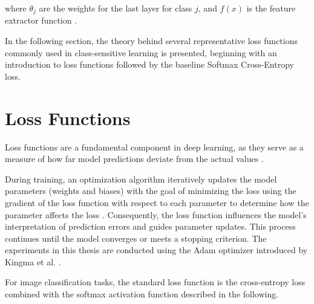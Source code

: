 \noindent where $\theta_j$ are the weights for the last layer for class $j$, and $f(x)$ is the feature extractor function \cite{ren2020balancedmetasoftmaxlongtailedvisual}.
\vspace{1em}

\noindent In the following section, the theory behind several representative loss functions commonly used in class-sensitive learning is presented, beginning with an introduction to loss functions followed by the baseline Softmax Cross-Entropy loss. 

\section{Loss Functions}
\label{sec:intro_losses}
Loss functions are a fundamental component in deep learning, as they serve as a measure of how far model predictions deviate from the actual values \cite{zhang2023dive,Goodfellow-et-al-2016}.

During training, an optimization algorithm iteratively updates the model parameters (weights and biases) with the goal of minimizing the loss using the gradient of the loss function with respect to each parameter to determine how the parameter affects the loss \cite{Goodfellow-et-al-2016}. Consequently, the loss function influences the model's interpretation of prediction errors and guides parameter updates. This process continues until the model converges or meets a stopping criterion. The experiments in this thesis are conducted using the Adam optimizer introduced by Kingma et al. \cite{kingma2017adammethodstochasticoptimization}.

For image classification tasks, the standard loss function is the cross-entropy loss combined with the softmax activation function \cite{zhang2023dive} described in the following.


